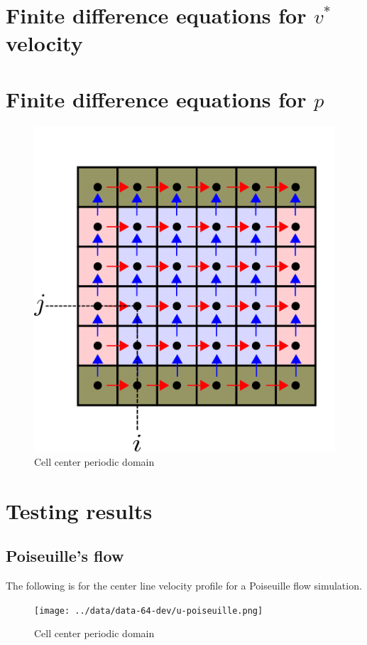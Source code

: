 \documentclass[12pt]{article}
\begin{document}
\section{Finite difference equations for $v^{\ast}$ velocity}
\section{Finite difference equations for $p$}
\begin{figure}[H]
    \includegraphics[height=0.5\textheight]{../../../media/periodic-BCs}
    \caption{Cell center periodic domain}
    \label{fig:periodic-domain}
\end{figure}                                                            

\section{Testing results}
\subsection{Poiseuille's flow}
The following is for the center line velocity profile for a Poiseuille flow
simulation.
\begin{figure}[H]
    \texttt{[image: ../data/data-64-dev/u-poiseuille.png]}
    \caption{Cell center periodic domain}
    \label{fig:periodic-domain}
\end{figure}                                                            
\end{document}
